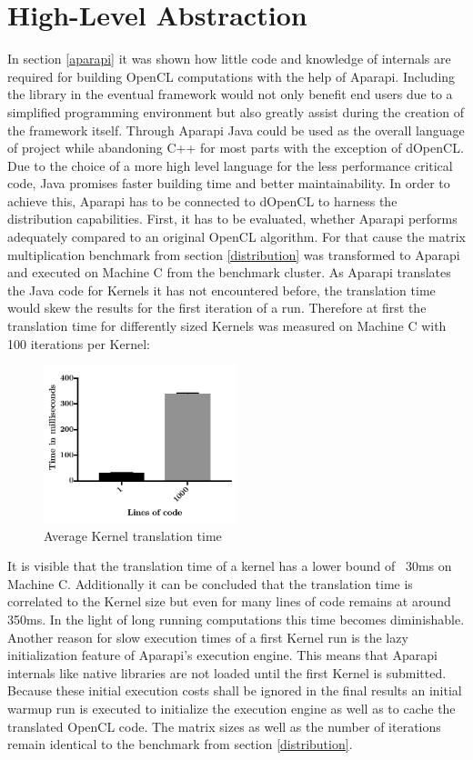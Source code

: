 \section{High-Level Abstraction}
\label{abstraction}

In section \ref{aparapi} it was shown how little code and knowledge of internals are required for building OpenCL computations with the help of Aparapi. Including the library in the eventual framework would not only benefit end users due to a simplified programming environment but also greatly assist during the creation of the framework itself. Through Aparapi Java could be used as the overall language of project while abandoning C++ for most parts with the exception of dOpenCL. Due to the choice of a more high level language for the less performance critical code, Java promises faster building time and better maintainability. In order to achieve this, Aparapi has to be connected to dOpenCL to harness the distribution capabilities. First, it has to be evaluated, whether Aparapi performs adequately compared to an original OpenCL algorithm. For that cause the matrix multiplication benchmark from section \ref{distribution} was transformed to Aparapi and executed on Machine C from the benchmark cluster. As Aparapi translates the Java code for Kernels it has not encountered before, the translation time would skew the results for the first iteration of a run. Therefore at first the translation time for differently sized Kernels was measured on Machine C with 100 iterations per Kernel:

\begin{figure}[H]
	\includegraphics[width=0.5\textwidth]{images/aparapi_translation.pdf}
	\centering
	\caption{Average Kernel translation time}
	\label{img:aparapi_translation}
\end{figure}

It is visible that the translation time of a kernel has a lower bound of ~30ms on Machine C. Additionally it can be concluded that the translation time is correlated to the Kernel size but even for many lines of code remains at around 350ms. In the light of long running computations this time becomes diminishable. Another reason for slow execution times of a first Kernel run is the lazy initialization feature of Aparapi's execution engine. This means that Aparapi internals like native libraries are not loaded until the first Kernel is submitted. Because these initial execution costs shall be ignored in the final results an initial warmup run is executed to initialize the execution engine as well as to cache the translated OpenCL code. The matrix sizes as well as the number of iterations remain identical to the benchmark from section \ref{distribution}.

